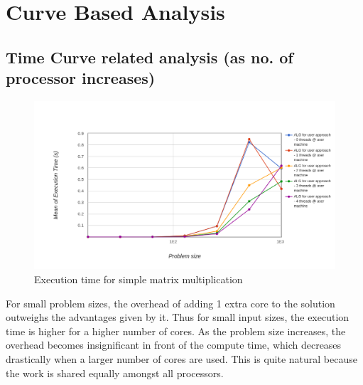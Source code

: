 \documentclass[runningheads, a4paper, oribibl]{llncs}
\begin{document}
\section{Curve Based Analysis}
\subsection{Time Curve related analysis (as no. of processor increases)}
\begin{figure}[h]
    \centering
    \includegraphics[width=\textwidth]{p1.png}
    \caption{Execution time for simple matrix multiplication}
    \label{fig:p1}
\end{figure}
For small problem sizes, the overhead of adding 1 extra core to the solution outweighs the advantages given by it. Thus for small input sizes, the execution time is higher for a higher number of cores. As the problem size increases, the overhead becomes insignificant in front of the compute time, which decreases drastically when a larger number of cores are used. This is quite natural because the work is shared equally amongst all processors.
\end{document}
